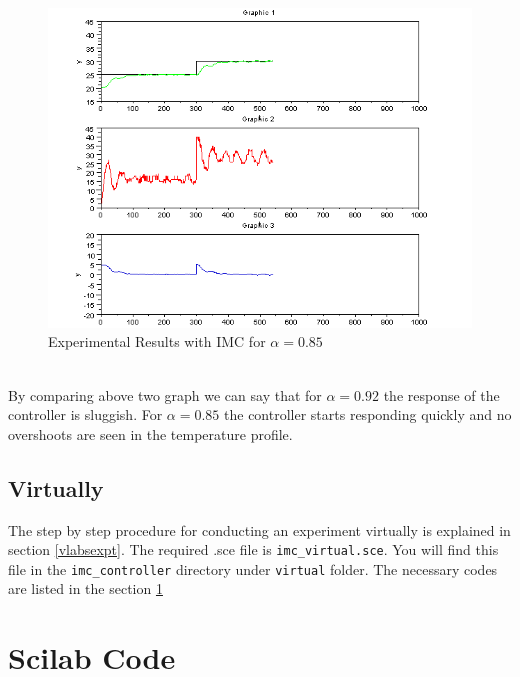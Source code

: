 \begin{figure}
	\centering
		\includegraphics[width=\linewidth]{IMC/imc_085_resp.png}
		\caption{Experimental Results with IMC for $\alpha=0.85$}
	\label{fig:0.98}
\end{figure}
\\By comparing above two graph we can say that for $\alpha=0.92$ the response of the controller is sluggish. For $\alpha=0.85$ the controller starts responding quickly and no overshoots are seen in the temperature profile.


\subsection{Virtually}
The step by step procedure for conducting an experiment virtually is explained in section \ref{vlabsexpt}. The required .sce file is {\tt imc\_virtual.sce}.  You will find this file in the {\tt imc\_controller} directory under {\tt virtual} folder. The necessary codes are listed in the section \ref{imccodes}


\section{Scilab Code}\label{imccodes}
\begin{code}

\end{code}

\begin{code}

\end{code}


\begin{code}

\end{code}


\begin{code}

\end{code}


% 
